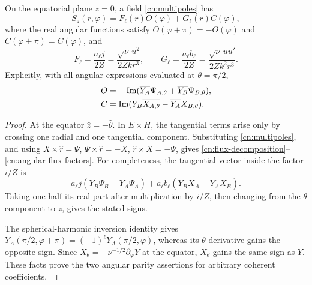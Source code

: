 \begin{lemma}
\label{cn:flux-split}
On the equatorial plane $z=0$, a field \eqref{cn:multipoles} has
\begin{equation}\label{cn:flux-decomposition}
 S_z(r,\varphi)=F_\ell(r)O(\varphi)+G_\ell(r)C(\varphi),
\end{equation}
where the real angular functions satisfy
$O(\varphi+\pi)=-O(\varphi)$ and
$C(\varphi+\pi)=C(\varphi)$, and
\begin{equation}\label{cn:radial-flux-factors}
 F_\ell=\frac{a_\ell j}{2Z}
        =\frac{\sqrt\nu\,u^2}{2Zkr^3},\qquad
 G_\ell=\frac{a_\ell b_\ell}{2Z}
        =\frac{\sqrt\nu\,u u'}{2Zk^2r^3}.
\end{equation}
Explicitly, with all angular expressions evaluated at $\theta=\pi/2$,
\begin{align}
 O&=-\operatorname{Im}
       (\overline{Y_A}\Psi_{A,\theta}
         +\overline{Y_B}\Psi_{B,\theta}),\notag\\
 C&=\operatorname{Im}
       (Y_B\overline{X_{A,\theta}}
         -\overline{Y_A}X_{B,\theta}).
 \label{cn:angular-flux-factors}
\end{align}
\end{lemma}
\begin{proof}
At the equator $\widehat z=-\widehat\theta$.  In
$E\times\overline H$, the tangential terms arise only by crossing one
radial and one tangential component.  Substituting
\eqref{cn:multipoles}, and using
$X\times\widehat r=\Psi$,
$\Psi\times\widehat r=-X$,
$\widehat r\times X=-\Psi$, gives
\eqref{cn:flux-decomposition}--\eqref{cn:angular-flux-factors}.
For completeness, the tangential vector inside the factor $i/Z$ is
\begin{equation}\label{cn:cross-product-check}
 a_\ell j(Y_B\overline{\Psi_B}-\overline{Y_A}\Psi_A)
 +a_\ell b_\ell
       (Y_B\overline{X_A}-\overline{Y_A}X_B).
\end{equation}
Taking one half its real part after multiplication by $i/Z$, then
changing from the $\theta$ component to $z$, gives the stated signs.

The spherical-harmonic inversion identity gives
$Y_A(\pi/2,\varphi+\pi)=(-1)^\ell Y_A(\pi/2,\varphi)$,
whereas its $\theta$ derivative gains the opposite sign.  Since
$X_\theta=-\nu^{-1/2}\partial_\varphi Y$ at the equator,
$X_\theta$ gains the same sign as $Y$.  These facts prove the two
angular parity assertions for arbitrary coherent coefficients.
\end{proof}

